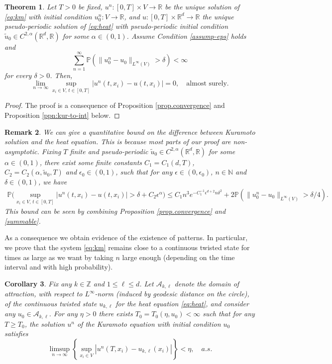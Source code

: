 \documentclass[a4paper,11pt]{amsart}
\newtheorem{theorem}{Theorem}
\newtheorem{corollary}[theorem]{Corollary}
\newtheorem{remark}[theorem]{Remark}
\newcommand{\red}[1]{{#1}}
\newcommand{\N}{\mathbb{N}}
\renewcommand{\P}{\mathbb{P}}
\newcommand{\R}{\mathbb{R}}
\newcommand{\T}{\mathbb{T}}
\newcommand{\Z}{\mathbb{Z}}
\newcommand{\ep}{\epsilon}
\newcommand{\purple}[1]{{\color{purple}#1}}{}
\numberwithin{equation}{section}
\numberwithin{theorem}{section}
\theoremstyle{definition}
\begin{document}
\begin{theorem}\label{thm.main}
Let $T>0$ be fixed, $u^n: [0,T]\times V\to\R$ be the unique solution of \eqref{eq:km} with initial condition $u_0^n:V\to\R$, and $u:[0,T]\times\R^d\to\R$ the unique \red{pseudo-periodic} solution of \eqref{eq:heat} with \red{pseudo-periodic} initial condition $\tilde u_0\in C^{2,\alpha}(\R^d, \R)$ for some $\alpha\in(0,1)$. Assume Condition \ref{assump-eps} holds and $$\sum_{n=1}^ \infty  \P\left(\|u^n_0 - u_0\|_{L^\infty(V)} > \delta \right)<\infty$$ for every $\delta>0$. Then,
\begin{equation*}
\lim_{n\to \infty }\sup_{x_i\in V,\, t\in[0,T]} |u^n(t,x_i) - u(t,x_i)| = 0, \quad \text{almost surely.}
\end{equation*}
\end{theorem}

\begin{proof}
The proof is a consequence of Proposition \ref{prop.convergence} and Proposition \ref{ppn:kur-to-int} below.
\end{proof}


\begin{remark}
We can give a quantitative bound on the difference between Kuramoto solution and the heat equation. This is because most parts of our proof are non-asymptotic. Fixing $T$ finite and \red{pseudo-periodic $\tilde u_0\in C^{2,\alpha}(\R^d, \R)$} for some $\alpha\in(0,1)$,  there exist some finite constants $C_1=C_1(d,T)$, $C_2=C_2(\alpha, \tilde u_0, T)$ and $\ep_0\in(0,1)$, such that for any $\ep\in(0,\ep_0)$, $n\in\N$ and $\delta\in(0,1)$, we have
\begin{align*}
\P\biggl(\sup_{x_i\in V,\, t\in[0,T]}|u^n(t, x_i) - u(t, x_i)|>\delta+C_2\ep^\alpha\biggr)\le C_1n^{3}e^{-C_1^{-1}\ep^{d+2} n \delta^2}+2\P\left(\|u^n_0 - u_0\|_{L^\infty(V)} > \delta/4 \right).
\end{align*}
This bound can be seen by combining Proposition \ref{prop.convergence} and \eqref{summable}. 
\end{remark}

As a consequence we obtain evidence of the existence of patterns. In particular, we prove that the system \eqref{eq:km} remains close to a continuous twisted state for times as large as we want by taking $n$ large enough (depending on the time interval and with high probability).

\begin{corollary}\label{cor}
Fix any $k\in\Z$ and $1\le\ell\le d$. Let $\mathcal A_{k,\ell}$ denote the domain of attraction, with respect to $L^\infty$-norm (induced by geodesic distance on the circle), of the continuous twisted state $u_{k,\ell}$ for the heat equation \eqref{eq:heat}, and consider any $u_0\in\mathcal A_{k,\ell}$. For any $\eta>0$ there exists $T_0=T_0(\eta, u_0)<\infty$ such that for any $T\ge T_0$, the solution $u^n$ of the Kuramoto equation with initial condition $u_0$ satisfies $$\limsup_{n\to\infty}\left\{\sup_{x_i\in V}|u^n(T,x_i)-u_{k,\ell}(x_i)|\right\}<\eta, \quad a.s.$$
\end{corollary}
\end{document}
